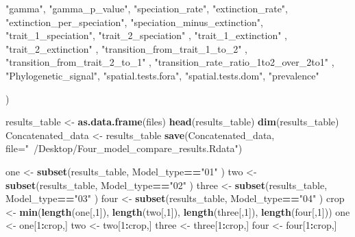 \documentclass[]{book}
\newenvironment{Shaded}{\begin{snugshade}}{\end{snugshade}}
\newcommand{\KeywordTok}[1]{\textcolor[rgb]{0.13,0.29,0.53}{\textbf{{#1}}}}
\newcommand{\DataTypeTok}[1]{\textcolor[rgb]{0.13,0.29,0.53}{{#1}}}
\newcommand{\DecValTok}[1]{\textcolor[rgb]{0.00,0.00,0.81}{{#1}}}
\newcommand{\StringTok}[1]{\textcolor[rgb]{0.31,0.60,0.02}{{#1}}}
\newcommand{\OperatorTok}[1]{\textcolor[rgb]{0.81,0.36,0.00}{\textbf{{#1}}}}
\newcommand{\NormalTok}[1]{{#1}}
\theoremstyle{definition}
\theoremstyle{definition}
\theoremstyle{remark}
\begin{document}
\begin{Shaded}
\begin{Highlighting}[]
    \StringTok{"gamma"}\NormalTok{,}
    \StringTok{"gamma_p_value"}\NormalTok{,}
    \StringTok{"speciation_rate"}\NormalTok{,}
    \StringTok{"extinction_rate"}\NormalTok{,}
    \StringTok{"extinction_per_speciation"}\NormalTok{,}
    \StringTok{"speciation_minus_extinction"}\NormalTok{,}
    \StringTok{"trait_1_speciation"}\NormalTok{,}
    \StringTok{"trait_2_speciation"}\NormalTok{ ,}
    \StringTok{"trait_1_extinction"}\NormalTok{ ,}
    \StringTok{"trait_2_extinction"}\NormalTok{ ,}
    \StringTok{"transition_from_trait_1_to_2"}\NormalTok{ ,}
    \StringTok{"transition_from_trait_2_to_1"}\NormalTok{ ,}
    \StringTok{"transition_rate_ratio_1to2_over_2to1"}\NormalTok{ ,}
    \StringTok{"Phylogenetic_signal"}\NormalTok{,}
    \StringTok{"spatial.tests.fora"}\NormalTok{,}
    \StringTok{"spatial.tests.dom"}\NormalTok{,}
    \StringTok{"prevalence"}
    
    
\NormalTok{  )}

\NormalTok{results_table <-}\StringTok{ }\KeywordTok{as.data.frame}\NormalTok{(files)}
\KeywordTok{head}\NormalTok{(results_table)}
\KeywordTok{dim}\NormalTok{(results_table)}
\NormalTok{Concatenated_data <-}\StringTok{ }\NormalTok{results_table}
\KeywordTok{save}\NormalTok{(Concatenated_data, }\DataTypeTok{file=}\StringTok{"~/Desktop/Four_model_compare_results.Rdata"}\NormalTok{)}

\NormalTok{one <-}\StringTok{ }\KeywordTok{subset}\NormalTok{(results_table, Model_type}\OperatorTok{==}\StringTok{"01"}\NormalTok{ )}
\NormalTok{two <-}\StringTok{ }\KeywordTok{subset}\NormalTok{(results_table, Model_type}\OperatorTok{==}\StringTok{"02"}\NormalTok{ )}
\NormalTok{three <-}\StringTok{ }\KeywordTok{subset}\NormalTok{(results_table, Model_type}\OperatorTok{==}\StringTok{"03"}\NormalTok{ )}
\NormalTok{four <-}\StringTok{ }\KeywordTok{subset}\NormalTok{(results_table, Model_type}\OperatorTok{==}\StringTok{"04"}\NormalTok{ )}
\NormalTok{crop <-}\StringTok{ }\KeywordTok{min}\NormalTok{(}\KeywordTok{length}\NormalTok{(one[,}\DecValTok{1}\NormalTok{]),}
\KeywordTok{length}\NormalTok{(two[,}\DecValTok{1}\NormalTok{]),}
\KeywordTok{length}\NormalTok{(three[,}\DecValTok{1}\NormalTok{]),}
\KeywordTok{length}\NormalTok{(four[,}\DecValTok{1}\NormalTok{]))}
\NormalTok{one <-}\StringTok{ }\NormalTok{one[}\DecValTok{1}\OperatorTok{:}\NormalTok{crop,]}
\NormalTok{two <-}\StringTok{ }\NormalTok{two[}\DecValTok{1}\OperatorTok{:}\NormalTok{crop,]}
\NormalTok{three <-}\StringTok{ }\NormalTok{three[}\DecValTok{1}\OperatorTok{:}\NormalTok{crop,]}
\NormalTok{four <-}\StringTok{ }\NormalTok{four[}\DecValTok{1}\OperatorTok{:}\NormalTok{crop,]}


\end{Highlighting}
\end{Shaded}
\end{document}
